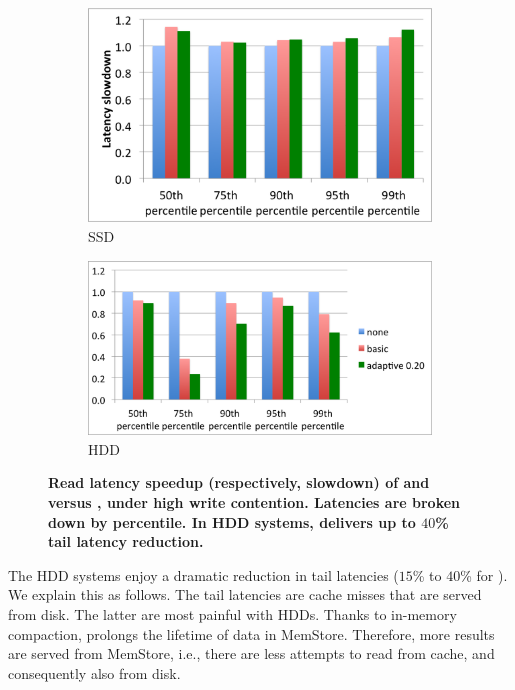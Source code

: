 \begin{figure}[t]
  \centering
  
  \begin{subfigure}[t]{.9\columnwidth}
      \includegraphics[width=\figw]{Figs/latency-ssd.png}
      \caption[]{SSD}
    \label{fig:latency:ssd}
  \end{subfigure}
  \begin{subfigure}[t]{1.1\columnwidth}
      \includegraphics[width=\figw]{Figs/latency-hdd.png}
      \caption[]{HDD}
    \label{fig:latency:hdd}
  \end{subfigure}

  \caption{\textbf{Read latency speedup (respectively, slowdown) of \basic\/ and \adp\/ versus \none, under high write contention.
  Latencies are broken down by percentile. In HDD systems, \adp\/ delivers up to $40$\% tail latency reduction. 
  }}
  
  \label{fig:latency}
\end{figure}

The HDD systems enjoy a dramatic reduction in tail latencies ($15$\% to $40$\% for \adp). 
We explain this as follows. The tail latencies are cache misses that are served from disk. 
The latter are most painful with HDDs. Thanks to in-memory compaction, \adp\/ prolongs 
the lifetime of data in MemStore. Therefore, more results are served from MemStore, i.e., 
there are less attempts to read from cache, and consequently also from disk.  

